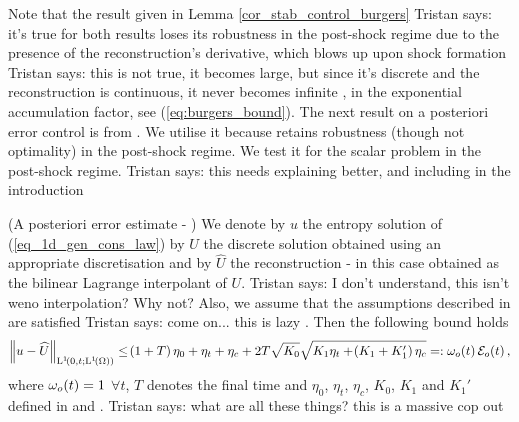 \documentclass[final]{amsart}
\newcommand{\tristan}[1]{{\color{purple} Tristan says:  #1 }}
\numberwithin{equation}{section}
\begin{document}

\begin{Rem}
  Note that the result given in Lemma \ref{cor_stab_control_burgers}
  \tristan{it's true for both results} loses its robustness in the
  post-shock regime due to the presence of the reconstruction's
  derivative, which blows up upon shock formation \tristan{this is not
    true, it becomes large, but since it's discrete and the
    reconstruction is continuous, it never becomes infinite}, in the exponential
  accumulation factor, see (\ref{eq:burgers_bound}).  The next result
  on a posteriori error control is from \cite{ohlberger2009review}.
  We utilise it because retains robustness (though not optimality) in
  the post-shock regime.  We test it for the scalar problem in the
  post-shock regime. \tristan{this needs explaining better, and including in the introduction}
\end{Rem} 

\begin{The}(A posteriori error estimate - \cite[Thm. 5]{ohlberger2009review})\label{thm:aposteriori_ohlberger}
  We denote by $u$ the entropy solution of (\ref{eq_1d_gen_cons_law})
  by $U$ the discrete solution obtained using an appropriate
  discretisation and by $\widehat{U}$ the reconstruction - in this
  case obtained as the bilinear Lagrange interpolant of
  $U$. \tristan{I don't understand, this isn't weno interpolation? Why
    not?} Also, we assume that the assumptions described in
  \cite[\S3]{ohlberger2009review} are satisfied \tristan{come on... this is lazy}.
  Then the following bound holds
  \begin{equation}\label{eq:bound_ohlberger}
    \begin{aligned}
      \left\|u-\widehat{U}\right\|_{\operatorname L^{1}\!\left({0,t;\operatorname L^{1}\!\left({\Omega}\right)}\right)}
      \leq
      \!\left({1+T}\right)\eta_0 
      +
      \eta_t
      +
      \eta_c
      +
      2T\sqrt{K_0}\sqrt{K_1\eta_t+\!\left({K_1+K_1'}\right)\eta_c}
      =:
      \omega_o\!\left({t}\right)\mathcal{E}_o\!\left({t}\right),
    \end{aligned}
  \end{equation}
  where $\omega_o\!\left({t}\right)=1$ $\forall t$, $T$ denotes the final time and
  $\eta_0$, $\eta_t$, $\eta_c$, $K_0$, $K_1$ and $K_1'$ defined in
  \cite[Cor.1]{ohlberger2009review} and
  \cite[Thm. 5]{ohlberger2009review}.  \tristan{what are all these things? this is a massive cop out}
\end{The}
\end{document}

